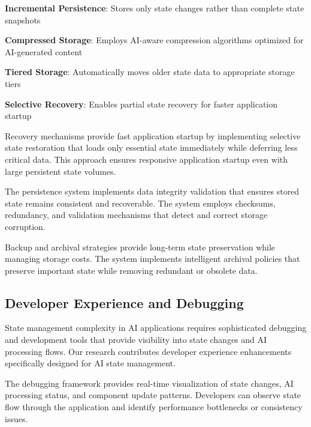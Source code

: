 \begin{expandedlist}
    \item \textbf{Incremental Persistence}: Stores only state changes rather than complete state snapshots
    \item \textbf{Compressed Storage}: Employs AI-aware compression algorithms optimized for AI-generated content
    \item \textbf{Tiered Storage}: Automatically moves older state data to appropriate storage tiers
    \item \textbf{Selective Recovery}: Enables partial state recovery for faster application startup
\end{expandedlist}

Recovery mechanisms provide fast application startup by implementing selective state restoration that loads only essential state immediately while deferring less critical data. This approach ensures responsive application startup even with large persistent state volumes.

The persistence system implements data integrity validation that ensures stored state remains consistent and recoverable. The system employs checksums, redundancy, and validation mechanisms that detect and correct storage corruption.

Backup and archival strategies provide long-term state preservation while managing storage costs. The system implements intelligent archival policies that preserve important state while removing redundant or obsolete data.

\subsection*{Developer Experience and Debugging}

State management complexity in AI applications requires sophisticated debugging and development tools that provide visibility into state changes and AI processing flows. Our research contributes developer experience enhancements specifically designed for AI state management.

The debugging framework provides real-time visualization of state changes, AI processing status, and component update patterns. Developers can observe state flow through the application and identify performance bottlenecks or consistency issues.

